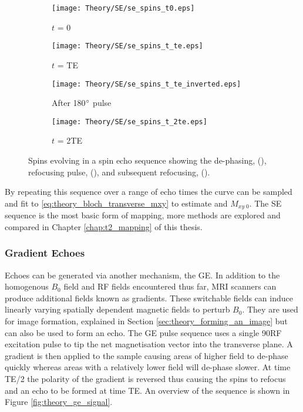 \begin{figure}[H]
	\centering
	\begin{subfigure}[c]{0.24\textwidth}
		\centering
		\texttt{[image: Theory/SE/se\_spins\_t0.eps]}
		\caption{$t$ = 0}
		\label{fig:theory_se_spins_t0}
	\end{subfigure}
	\hfill
	\begin{subfigure}[c]{0.24\textwidth}
		\centering
		\texttt{[image: Theory/SE/se\_spins\_t\_te.eps]}
		\caption{$t$ = TE}
		\label{fig:theory_se_spins_t_te_by_2}
	\end{subfigure}
	\begin{subfigure}[c]{0.24\textwidth}
		\centering
		\texttt{[image: Theory/SE/se\_spins\_t\_te\_inverted.eps]}
		\caption{After 180$\degree$ pulse}
		\label{fig:theory_se_spins_t_te_by_2_inverted}
	\end{subfigure}
	\begin{subfigure}[c]{0.24\textwidth}
		\centering
		\texttt{[image: Theory/SE/se\_spins\_t\_2te.eps]}
		\caption{$t$ = 2TE}
		\label{fig:theory_se_spins_t_te}
	\end{subfigure}
	\caption{Spins evolving in a spin echo sequence showing the de-phasing, (), refocusing pulse, (), and subsequent refocusing, ().}
	\label{fig:theory_se_spins}
\end{figure}

By repeating this sequence over a range of echo times the \ttwo curve can be sampled and fit to \eqref{eq:theory_bloch_transverse_mxy} to estimate \ttwo and $M_{xy\; 0}$. The \ac{SE} sequence is the most basic form of \ttwo mapping, more methods are explored and compared in Chapter \ref{chap:t2_mapping} of this thesis.

\subsubsection{Gradient Echoes}
\label{subsubsec:theory_ge}
Echoes can be generated via another mechanism, the \ac{GE}. In addition to the homogenous $B_0$ field and \ac{RF} fields encountered thus far, \ac{MRI} scanners can produce additional fields known as gradients. These switchable fields can induce linearly varying spatially dependent magnetic fields to perturb $B_0$. They are used for image formation, explained in Section \ref{sec:theory_forming_an_image} but can also be used to form an echo. The \ac{GE} pulse sequence uses a single 90\degree{ }\ac{RF} excitation pulse to tip the net magnetisation vector into the transverse plane. A gradient is then applied to the sample causing areas of higher field to de-phase quickly whereas areas with a relatively lower field will de-phase slower. At time \ac{TE}/2 the polarity of the gradient is reversed thus causing the spins to refocus and an echo to be formed at time \ac{TE}. An overview of the sequence is shown in Figure \ref{fig:theory_ge_signal}. 

